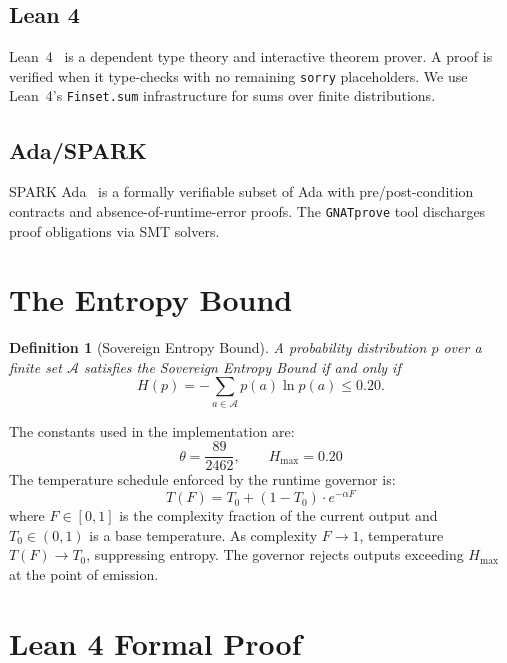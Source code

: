 \documentclass[sigconf,natbib=false]{acmart}
\newtheorem{definition}{Definition}
\begin{document}
\subsection{Lean 4}

Lean~4~\cite{moura2021lean4} is a dependent type theory and interactive theorem
prover. A proof is verified when it type-checks with no remaining \texttt{sorry}
placeholders. We use Lean~4's \texttt{Finset.sum} infrastructure for sums over
finite distributions.

\subsection{Ada/SPARK}

SPARK Ada~\cite{mccormick2015spark} is a formally verifiable subset of Ada with
pre/post-condition contracts and absence-of-runtime-error proofs. The
\texttt{GNATprove} tool discharges proof obligations via SMT solvers.


\section{The Entropy Bound}
\label{sec:bound}

\begin{definition}[Sovereign Entropy Bound]
A probability distribution $p$ over a finite set $\mathcal{A}$ satisfies the
\emph{Sovereign Entropy Bound} if and only if
\[
  H(p) = -\sum_{a \in \mathcal{A}} p(a) \ln p(a) \leq 0.20.
\]
\end{definition}

The constants used in the implementation are:
\[
  \theta = \frac{89}{2462}, \qquad H_{\max} = 0.20
\]
The temperature schedule enforced by the runtime governor is:
\[
  T(F) = T_0 + (1 - T_0)\cdot e^{-\alpha F}
\]
where $F \in [0,1]$ is the complexity fraction of the current output and
$T_0 \in (0,1)$ is a base temperature. As complexity $F \to 1$, temperature
$T(F) \to T_0$, suppressing entropy. The governor rejects outputs exceeding
$H_{\max}$ at the point of emission.


\section{Lean 4 Formal Proof}
\label{sec:lean4}
\end{document}
